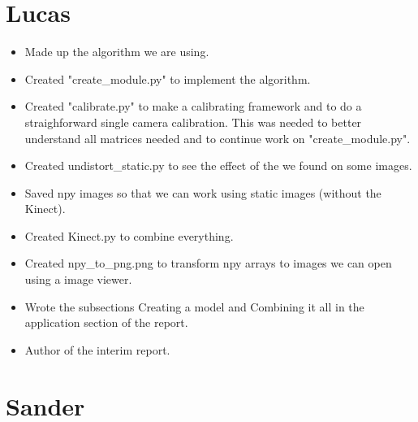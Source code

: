 \section*{Lucas}
\begin{itemize}
\item Made up the algorithm we are using.
\item Created "create\_module.py" to implement the algorithm.
\item Created "calibrate.py" to make a calibrating framework and to do a 
straighforward single camera calibration. This was needed to better understand 
all matrices needed and to continue work on "create\_module.py".
\item Created undistort\_static.py to see the effect of the we found on some images.
\item Saved npy images so that we can work using static images (without the Kinect).
\item Created Kinect.py to combine everything.
\item Created npy\_to\_png.png to transform npy arrays to images we can open 
using a image viewer.
\item Wrote the subsections Creating a model and Combining it all in the 
application section of the report.
\item Author of the interim report.
\end{itemize}
\section*{Sander}
